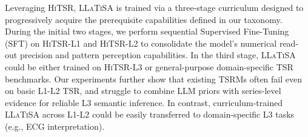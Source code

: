 \documentclass[11pt]{article}
\begin{document}
Leveraging \textsc{HiTSR}, \textsc{LLaTiSA} is trained via a three-stage curriculum designed to progressively acquire the prerequisite capabilities defined in our taxonomy.
During the initial two stages, we perform sequential Supervised Fine-Tuning (SFT) on \textsc{HiTSR-L1} and \textsc{HiTSR-L2} to consolidate the model's numerical read-out precision and pattern perception capabilities. 
In the third stage, \textsc{LLaTiSA} could be either trained on \textsc{HiTSR-L3} or general-purpose domain-specific TSR benchmarks. Our experiments further show that existing TSRMs often fail even on basic L1-L2 TSR, and struggle to combine LLM priors with series-level evidence for reliable L3 semantic inference. In contrast, curriculum-trained \textsc{LLaTiSA} across L1-L2 could be easily transferred to domain-specific L3 tasks (e.g., ECG interpretation).
\end{document}
